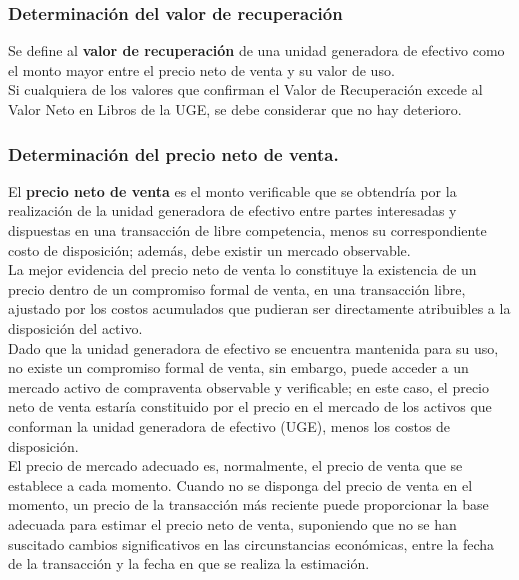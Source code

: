 \subsubsection{Determinación del valor de recuperación}

Se define al \textcolor{principal}{\textbf{valor de recuperación}} de una unidad generadora de efectivo como el monto mayor entre el  precio neto de venta y su valor de uso.\\

Si cualquiera de los valores que confirman el Valor de Recuperación excede al Valor Neto en Libros de la UGE, se debe considerar que no hay deterioro.\\

\subsubsection{Determinación del precio neto de venta.} 

El \textcolor{principal}{\textbf{precio neto de venta}} es el monto verificable que se obtendría por la realización de la unidad generadora de efectivo entre partes interesadas y dispuestas en una transacción de libre competencia, menos su correspondiente costo de disposición; además, debe existir un mercado observable.\\

La mejor evidencia del precio neto de venta lo constituye la existencia de un precio dentro de un compromiso formal de venta, en una transacción libre, ajustado por los costos acumulados que pudieran ser directamente atribuibles a la disposición del activo.\\

Dado que la unidad generadora de efectivo se encuentra mantenida para su uso, no existe un compromiso formal  de venta, sin embargo, puede acceder a un mercado activo de compraventa observable y verificable; en este caso, el precio neto de venta estaría constituido por el precio en el mercado de los activos que conforman la unidad generadora de efectivo (UGE), menos los costos de disposición.\\ 

El precio de mercado adecuado es, normalmente, el precio de venta que se establece a cada momento. Cuando no se disponga del precio de venta en el momento, un precio de la transacción más reciente puede proporcionar la base adecuada para estimar el precio neto de venta, suponiendo que no se han suscitado cambios significativos en las circunstancias económicas, entre la fecha de la transacción y la fecha en que se realiza la estimación.\\

